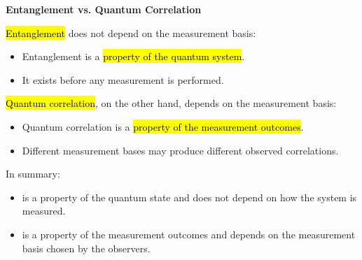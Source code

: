 \highspace
\begin{flushleft}
    \textcolor{DarkOrange3}{ \textbf{Entanglement vs. Quantum Correlation}}
\end{flushleft}
\hl{Entanglement} does not depend on the measurement basis:
\begin{itemize}
    \item Entanglement is a \hl{property of the quantum system}.
    \item It exists before any measurement is performed.
\end{itemize}
\hl{Quantum correlation}, on the other hand, depends on the measurement basis:
\begin{itemize}
    \item Quantum correlation is a \hl{property of the measurement outcomes}.
    \item Different measurement bases may produce different observed correlations.
\end{itemize}
In summary:
\begin{itemize}
    \item {} is a property of the quantum state and does not depend on how the system is measured.
    \item {} is a property of the measurement outcomes and depends on the measurement basis chosen by the observers.
\end{itemize}